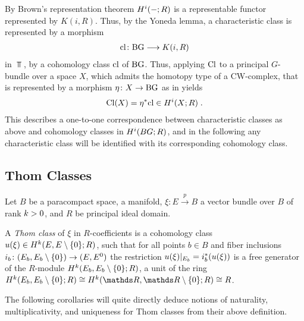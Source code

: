 \begin{Rem}
  By Brown's representation theorem 
  $H^i(-;R)$ is a representable functor represented by $K(i,R)$.
  Thus, by the Yoneda lemma, a characteristic class is
  represented by a morphism
  \begin{gather*}
    \mathrm{cl}\colon \mathrm{BG} \longrightarrow K(i, R)
  \end{gather*}
  in $\Top$, \idest by a cohomology class $\mathrm{cl}$ of $\mathrm{BG}$.
  Thus, applying $\mathrm{Cl}$ to a principal $G$-bundle over a
  space $X$, which admits the homotopy type of a CW-complex, that is
  represented by a morphism $\eta\colon X\to\mathrm{BG}$
  as in 
  yields
  \begin{gather*}
    \mathrm{Cl}(X) = {\eta}^* \mathrm{cl} \in H^i(X;R)
    \;.
  \end{gather*}
  This describes a one-to-one correspondence between
  characteristic classes as above and cohomology classes in
  $H^i(BG;R)$, and in the following any characteristic class will be
  identified with its corresponding cohomology class.
\end{Rem}

\begin{Rem}
\end{Rem}

\subsection{Thom Classes}
Let $B$ be a paracompact space, \forexample a manifold,
$\xi\colon E\xrightarrow{p} B$ a vector bundle over $B$ of rank $k>0$,
and $R$ be principal ideal domain.
\begin{Def}
  A \emph{Thom class} of $\xi$ in $R$-coefficients is a
  cohomology class ${u}(\xi)\in H^{k}(E, {E}\setminus\{0\}; R)$,
  such that for all points $b\in B$ and fiber inclusions
  $i_b\colon (E_b, {E_b}\setminus\{0\}) \to (E, {E}^0)$
  the restriction ${u}(\xi)|_{E_b} = {i}^*_b ({u}(\xi))$ is a
  free generator of the $R$-module $H^{k}(E_b, {E_b}\setminus\{0\}; R)$,
  \idest a unit
  of the ring
  $\H^{\rkk}(\spherepair{E_b};R)\cong \H^{\rkk}(\spherepair{\R}; R)\cong R$.
\end{Def}

The following corollaries will quite directly deduce notions of
naturality, multiplicativity, and uniqueness for Thom classes from
their above definition.

